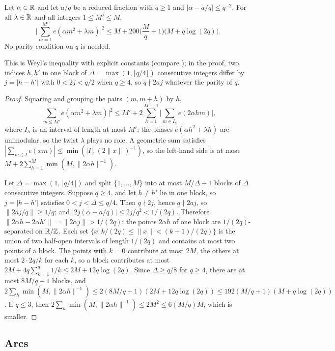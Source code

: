 \begin{lemma}
\label{lem:record:weyl-even}
Let $\alpha\in\mathbb R$ and let $a/q$ be a reduced fraction with $q\ge1$ and
$|\alpha-a/q|\le q^{-2}$. For all $\lambda\in\mathbb R$ and all integers
$1\le M'\le M$,
\[
 \Big|\sum_{m=1}^{M'}e(\alpha m^2+\lambda m)\Big|^2
 \le M+200\Big(\frac Mq+1\Big)\big(M+q\log(2q)\big).
\]
No parity condition on $q$ is needed.
\end{lemma}

This is Weyl's inequality with explicit constants (compare
\cite[Lemma~2.4]{Vaughan97}); in the proof, two indices $h,h'$ in one block of $\Delta=\max(1,\lfloor q/4\rfloor)$ consecutive integers differ by $j=|h-h'|$ with $0<2j<q/2$ when $q\ge4$, so $q\nmid2aj$ whatever the parity of $q$.

\begin{proof}
Squaring and grouping the pairs $(m,m+h)$ by $h$,
\[
 \Big|\sum_{m\le M'}e(\alpha m^2+\lambda m)\Big|^2\le M'+2\sum_{h=1}^{M'-1}
 \Big|\sum_{m\in I_h}e(2\alpha hm)\Big|,
\]
where $I_h$ is an interval of length at most $M'$; the phases
$e(\alpha h^2+\lambda h)$ are unimodular, so the twist $\lambda$ plays no
role. A geometric sum satisfies $|\sum_{m\in I}e(xm)|\le\min(|I|,(2\|x\|)^{-1})$,
so the left-hand side is at most $M+2\sum_{h=1}^M\min(M,\|2\alpha h\|^{-1})$.

Let $\Delta=\max(1,\lfloor q/4\rfloor)$ and split $\{1,\dots,M\}$ into at most
$M/\Delta+1$ blocks of $\Delta$ consecutive integers. Suppose $q\ge4$, and let
$h\ne h'$ lie in one block, so $j=|h-h'|$ satisfies $0<j<\Delta\le q/4$. Then
$q\nmid2j$, hence $q\nmid2aj$, so $\|2aj/q\|\ge1/q$; and
$|2j(\alpha-a/q)|\le2j/q^2<1/(2q)$. Therefore
$\|2\alpha h-2\alpha h'\|=\|2\alpha j\|>1/(2q)$: the points $2\alpha h$ of one
block are $1/(2q)$-separated on $\mathbb R/\mathbb Z$. Each set
$\{x:k/(2q)\le\|x\|<(k+1)/(2q)\}$ is the union of two half-open intervals of
length $1/(2q)$ and contains at most two points of a block. The points with
$k=0$ contribute at most $2M$, the others at most $2\cdot2q/k$ for each $k$,
so a block contributes at most $2M+4q\sum_{k=1}^q1/k\le2M+12q\log(2q)$. Since
$\Delta\ge q/8$ for $q\ge4$, there are at most $8M/q+1$ blocks, and
$2\sum_h\min(M,\|2\alpha h\|^{-1})\le2(8M/q+1)(2M+12q\log(2q))
\le192(M/q+1)(M+q\log(2q))$. If $q\le3$, then $2\sum_h\min(M,\|2\alpha h\|^{-1})\le2M^2\le6(M/q)M$, which is
smaller.
\end{proof}

\subsection{Arcs}

